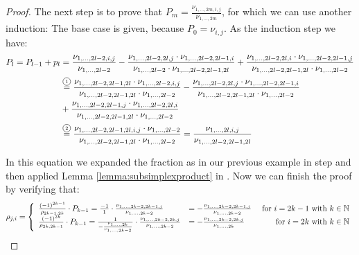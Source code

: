 \documentclass[../SymplecticSimplices.tex]{subfiles}
\begin{document}
\begin{proof}
  The next step is to prove that \( P_m = \frac{\nu_{1, \dots, 2m, i, j}}{\nu_{1, \dots, 2m}} \), for which we can use another induction: The base case is given, because \( P_0 = \nu_{i,j} \). As the induction step we have:
\begin{align*}
  P_{l} = P_{l-1} + p_l & = \frac{\nu_{1, \dots, 2l-2, i, j}}{\nu_{1, \dots, 2l-2}} - \frac{\nu_{1, \dots, 2l-2, 2l, j} \cdot \nu_{1, \dots, 2l-2,2l-1,i}}{\nu_{1, \dots, 2l-2} \cdot \nu_{1, \dots, 2l-2, 2l-1, 2l}} + \frac{\nu_{1, \dots, 2l-2,2l,i} \cdot \nu_{1, \dots, 2l-2, 2l-1, j}}{\nu_{1, \dots, 2l-2, 2l-1, 2l} \cdot \nu_{1, \dots, 2l-2}} \\
                        & \eqcom{1} \frac{\nu_{1, \dots, 2l-2, 2l-1, 2l} \cdot \nu_{1, \dots, 2l-2, i, j}}{\nu_{1, \dots, 2l-2, 2l-1, 2l} \cdot \nu_{1, \dots, 2l-2}} - \frac{\nu_{1, \dots, 2l-2, 2l, j} \cdot \nu_{1, \dots, 2l-2,2l-1,i}}{\nu_{1, \dots, 2l-2, 2l-1, 2l} \cdot \nu_{1, \dots, 2l-2}}\\
                        & + \frac{\nu_{1, \dots, 2l-2, 2l-1, j} \cdot \nu_{1, \dots, 2l-2, 2l, i}}{\nu_{1, \dots, 2l-2, 2l-1, 2l} \cdot \nu_{1, \dots, 2l-2}}\\
                        & \eqcom{2} \frac{\nu_{1, \dots, 2l-2, 2l-1, 2l, i, j} \cdot \nu_{1, \dots, 2l-2}}{\nu_{1, \dots, 2l-2, 2l-1, 2l} \cdot \nu_{1, \dots, 2l-2}} = \frac{\nu_{1, \dots, 2l, i, j}}{\nu_{1, \dots, 2l-2, 2l-1, 2l}}
\end{align*}

In this equation we expanded the fraction as in our previous example in step  and then applied Lemma \ref{lemma:subsimplexproduct} in . Now we can finish the proof by verifying that:
\begin{equation*}
  \rho_{j, i} = \left\lbrace\begin{array}{llr}
      \frac{\left( -1 \right)^{2k-1}}{\rho_{2k-1, 2k}}\cdot P_{k-1} = \frac{-1}{1} \cdot \frac{\nu_{1, \dots, 2k-2, 2k-1, j}}{\nu_{1, \dots, 2k-2}} & = -\frac{\nu_{1, \dots, 2k-2, 2k-1, j}}{\nu_{1, \dots, 2k-2}} & \textnormal{ for } i = 2k - 1 \textnormal{ with } k \in \mathbb{N}\\
      \frac{\left( -1 \right)^{2k}}{\rho_{2k, 2k-1}} \cdot P_{k-1} = \frac{1}{-\frac{\nu_{1,\dots,2k}}{\nu_{1,\dots,2k-2}}} \cdot \frac{\nu_{1, \dots, 2k-2, 2k, j}}{\nu_{1, \dots, 2k-2}} & = -\frac{\nu_{1, \dots, 2k-2, 2k, j}}{\nu_{1, \dots, 2k}} & \textnormal{ for } i = 2k \textnormal{ with } k \in \mathbb{N}
\end{array}\right.
\end{equation*}
\end{proof}
\end{document}
